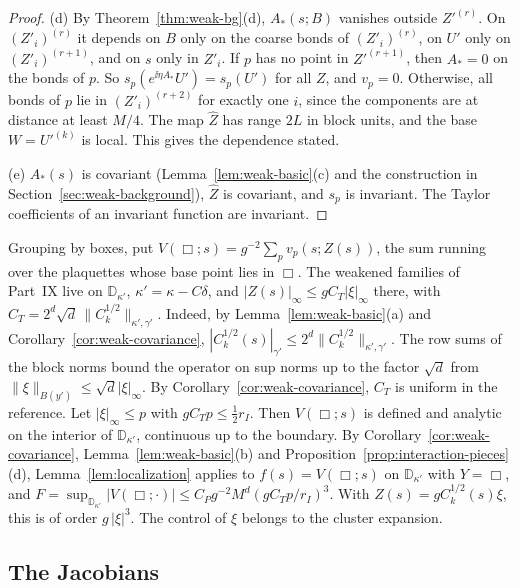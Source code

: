 \begin{proof}
(d) By Theorem~\ref{thm:weak-bg}(d), $A_*(s;B)$ vanishes outside $Z'^{(r)}$. On $(Z'_i)^{(r)}$ it depends on $B$ only on the coarse bonds of $(Z'_i)^{(r)}$, on $U'$ only on $(Z'_i)^{(r+1)}$, and on $s$ only in $Z'_i$. If $p$ has no point in $Z'^{(r+1)}$, then $A_*=0$ on the bonds of $p$. So $s_p(e^{\ii\eta A_*}U')=s_p(U')$ for all $Z$, and $v_p=0$. Otherwise, all bonds of $p$ lie in $(Z'_i)^{(r+2)}$ for exactly one $i$, since the components are at distance at least $M/4$. The map $\hat Z$ has range $2L$ in block units, and the base $W=U'^{(k)}$ is local. This gives the dependence stated.

(e) $A_*(s)$ is covariant (Lemma~\ref{lem:weak-basic}(c) and the construction in Section~\ref{sec:weak-background}), $\hat Z$ is covariant, and $s_p$ is invariant. The Taylor coefficients of an invariant function are invariant.
\end{proof}

Grouping by boxes, put $V(\Box;s)=g^{-2}\sum_{p}v_p(s;Z(s))$, the sum running over the plaquettes whose base point lies in $\Box$. The weakened families of Part~IX live on $\mathbb D_{\kappa'}$, $\kappa'=\kappa-C\delta$, and $|Z(s)|_\infty\le gC_T|\xi|_\infty$ there, with $C_T=2^d\sqrt d\,\|C_k^{1/2}\|_{\kappa',\gamma'}$. Indeed, by Lemma~\ref{lem:weak-basic}(a) and Corollary~\ref{cor:weak-covariance}, $|C_k^{1/2}(s)|_{\gamma'}\le2^d\|C_k^{1/2}\|_{\kappa',\gamma'}$. The row sums of the block norms bound the operator on sup norms up to the factor $\sqrt d$ from $\|\xi\|_{B(y')}\le\sqrt d|\xi|_\infty$. By Corollary~\ref{cor:weak-covariance}, $C_T$ is uniform in the reference. Let $|\xi|_\infty\le p$ with $gC_Tp\le\frac12r_I$. Then $V(\Box;s)$ is defined and analytic on the interior of $\mathbb D_{\kappa'}$, continuous up to the boundary. By Corollary~\ref{cor:weak-covariance}, Lemma~\ref{lem:weak-basic}(b) and Proposition~\ref{prop:interaction-pieces}(d), Lemma~\ref{lem:localization} applies to $f(s)=V(\Box;s)$ on $\mathbb D_{\kappa'}$ with $Y=\Box$, and $F=\sup_{\mathbb D_{\kappa'}}|V(\Box;\cdot)|\le C_Pg^{-2}M^d(gC_Tp/r_I)^3$. With $Z(s)=gC_k^{1/2}(s)\xi$, this is of order $g\,|\xi|^3$. The control of $\xi$ belongs to the cluster expansion.

\subsection{The Jacobians}\label{subsec:sq-jacobians}

